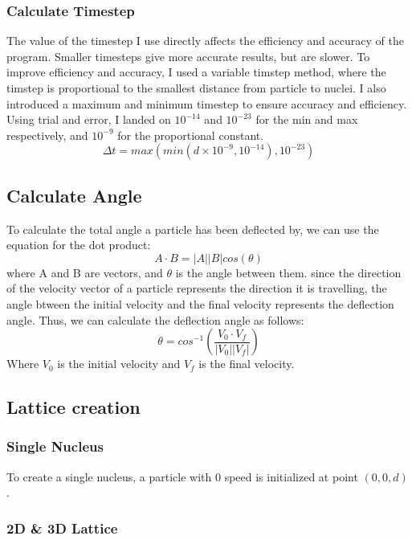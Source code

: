 \documentclass[11pt]{article}
\begin{document}
    \hypertarget{calculate-timestep}{%
\subsubsection{Calculate Timestep}\label{calculate-timestep}}

The value of the timestep I use directly affects the efficiency and
accuracy of the program. Smaller timesteps give more accurate results,
but are slower. To improve efficiency and accuracy, I used a variable
timstep method, where the timstep is proportional to the smallest
distance from particle to nuclei. I also introduced a maximum and
minimum timestep to ensure accuracy and efficiency. Using trial and
error, I landed on \(10^{-14}\) and \(10^{-23}\) for the min and max
respectively, and \(10^{-9}\) for the proportional constant.
\[ \Delta t=max(min(d\times 10^{-9}, 10^{-14}), 10^{-23}) \]

    \hypertarget{calculate-angle}{%
\subsection{Calculate Angle}\label{calculate-angle}}

To calculate the total angle a particle has been deflected by, we can
use the equation for the dot product:
\[ A \cdot B = |A||B|cos(\theta) \] where A and B are vectors, and
\(\theta\) is the angle between them. since the direction of the
velocity vector of a particle represents the direction it is travelling,
the angle btween the initial velocity and the final velocity represents
the deflection angle. Thus, we can calculate the deflection angle as
follows:
\[ \theta = cos^{-1}(\frac{V_{0} \cdot V_{f}}{|V_{0}||V_{f}|}) \] Where
\(V_{0}\) is the initial velocity and \(V_{f}\) is the final velocity.

    \hypertarget{lattice-creation}{%
\subsection{Lattice creation}\label{lattice-creation}}

\hypertarget{single-nucleus}{%
\subsubsection{Single Nucleus}\label{single-nucleus}}

To create a single nucleus, a particle with 0 speed is initialized at
point \((0, 0, d)\).

\hypertarget{d-3d-lattice}{%
\subsubsection{2D \& 3D Lattice}\label{d-3d-lattice}}
\end{document}
